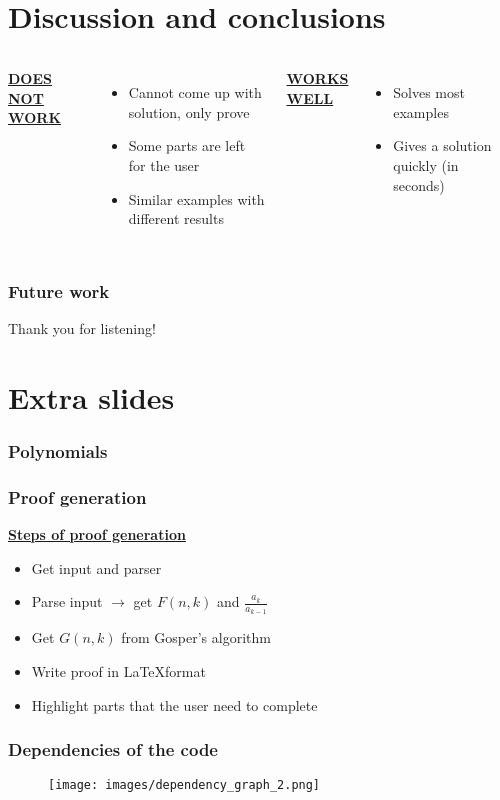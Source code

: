 \documentclass{beamer}
\newcommand{\ubf}[1]{\underline{\textbf{#1}}}
\begin{document}
\section{Discussion and conclusions}
\begin{frame}
  \begin{columns}[t]

  \center
  \ubf{DOES NOT WORK}

  \justify
  \begin{itemize}
    \item<2-> Cannot come up with solution, only prove
    \item<3-> Some parts are left for the user
    \item<4-> Similar examples with different results
  \end{itemize}
  \center
  \ubf{WORKS WELL}

  \justify
  \begin{itemize}
    \item<5-> Solves most examples
    \item<6-> Gives a solution quickly (in seconds)
  \end{itemize}
  \end{columns}
\end{frame}
\begin{frame}
  \frametitle{Future work}
\end{frame}
\begin{frame}
  \Huge\center
  Thank you for listening!
\end{frame}

\appendix
\section*{Extra slides}%
\begin{frame}
  \frametitle{Polynomials}
\end{frame}
\begin{frame}
  \frametitle{Proof generation}
  \ubf{Steps of proof generation}
  \pause
  \begin{itemize}
    \item Get input and parser
    \pause
    \item Parse input $\rightarrow$ get $F(n,k)$ and $\frac{a_k}{a_{k-1}}$
    \pause
    \item Get $G(n,k)$ from Gosper's algorithm
    \pause
    \item Write proof in \LaTeX format
    \pause
    \item Highlight parts that the user need to complete
  \end{itemize}
\end{frame}
\begin{frame}
  \frametitle{Dependencies of the code}
  \begin{figure}
  \texttt{[image: images/dependency\_graph\_2.png]}
  \end{figure}
\end{frame}
\end{document}
